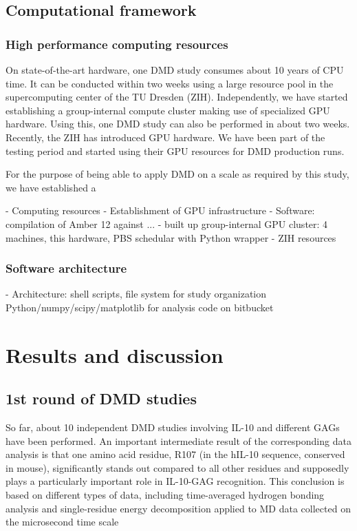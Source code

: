 \subsection{Computational framework}

\subsubsection{High performance computing resources}


 On state-of-the-art hardware, one
DMD study consumes about 10 years of CPU time. It can be conducted within two
weeks using a large resource pool in the supercomputing center of the TU Dresden (ZIH).
Independently, we have started establishing a group-internal compute cluster making
use of specialized GPU hardware. Using this, one DMD study can also be performed
in about two weeks. Recently, the ZIH has introduced GPU hardware. We have been
part of the testing period and started using their GPU resources for DMD production
runs.

For the purpose of being able to apply DMD on a scale as required by this study,
we have established a

        - Computing resources
            - Establishment of GPU infrastructure
                - Software: compilation of Amber 12 against ...
                - built up group-internal GPU cluster:
                    4 machines, this hardware, PBS schedular with Python wrapper
                - ZIH resources

\subsubsection{Software architecture}

        - Architecture:
            shell scripts, file system for study organization
            Python/numpy/scipy/matplotlib for analysis
            code on bitbucket



\section{Results and discussion}

\subsection{1st round of DMD studies}



So far, about 10 independent DMD studies involving IL-10 and different GAGs have
been performed. An important intermediate result of the corresponding data analysis
is that one amino acid residue, R107 (in the hIL-10 sequence, conserved in mouse), significantly
stands out compared to all other residues and supposedly plays a particularly
important role in IL-10-GAG recognition. This conclusion is based on different types
of data, including time-averaged hydrogen bonding analysis and single-residue energy
decomposition applied to MD data collected on the microsecond time scale

